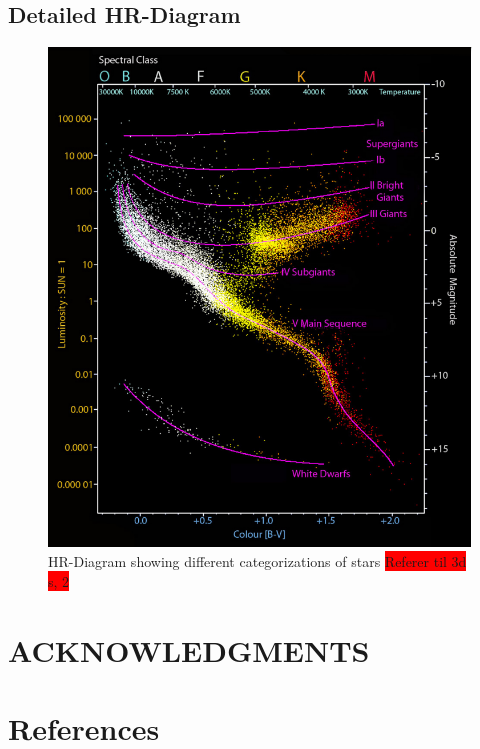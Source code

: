 \documentclass[reprint,english,notitlepage]{revtex4-2}
\begin{document}
\subsection{Detailed HR-Diagram}
\begin{figure}[h!]
  \centering
  \includegraphics[scale = .75]{figures/Spectral_class.png}
  \caption{HR-Diagram showing different categorizations of stars \colorbox{red}{Referer til 3d s, 2}}
  \label{fig: Spectral class}
\end{figure}
\clearpage
\twocolumngrid

\section*{ACKNOWLEDGMENTS}

\section*{References} \label{sec: references}
\end{document}
